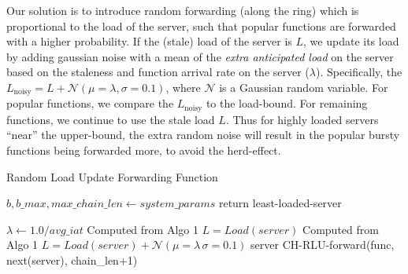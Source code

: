Our solution is to introduce random forwarding (along the ring) which is proportional to the load of the server, such that popular functions are forwarded with a higher probability. 
If the (stale) load of the server is $L$, we update its load by adding gaussian noise with a mean of the \emph{extra anticipated load} on the server based on the staleness and function arrival rate on the server ($\lambda$).
Specifically, the $L_{\text{noisy}}=L+\mathcal{N}(\mu=\lambda, \sigma=0.1)$, where $\mathcal{N}$ is a Gaussian random variable. 
For popular functions, we  compare the $L_{\text{noisy}}$ to the load-bound.
For remaining functions, we continue to use the stale load $L$. 
Thus for highly loaded servers ``near'' the upper-bound, the extra random noise will result in the popular bursty functions being forwarded more, to avoid the herd-effect.

\begin{comment}
To achieve this, we introduce Gaussian noise to the forwarding decision.
We compute the global arrival rate, then estimate the per-server arrival rate and the effect an invocation has on server load, following the steps in Algorithm~\ref{algo:PopularRLUPolicy}.
For each server we then sample noise from the normal distribution whos mean is centered on the \textit{extra\_anticip\_load}, and add that to the server's tracked load to get \textit{Lnoise}.
We iterate along the ring of servers until we find one with a \textit{Lnoise} less than the global \textit{bounded\_ceil}.
In the case where we skip over 3 servers, we assume that the invocation will run cold no matter what, and assign it to the least loaded server.
\end{comment}


\begin{algorithm}
  \caption{Random Load Update Forwarding Function}
  \begin{algorithmic}[1]
    \State $b, b\_max, max\_chain\_len \gets system\_params $
    \State return least-loaded-server
    \EndIf 

    \State $\lambda \gets 1.0 / avg\_iat$ \Comment Computed from Algo 1
     \State $L=Load(server)$
     \Comment Computed from Algo 1 
         \State $L = Load(server) + \mathcal{N}(\mu=\lambda\,\sigma=0.1)$
    \EndIf 
       \State server
    \Else \State CH-RLU-forward(func, next(server), chain\_len+1)
    \EndIf
    \EndProcedure
    \end{algorithmic}
\label{algo:PopularRLUPolicy}
\end{algorithm}

